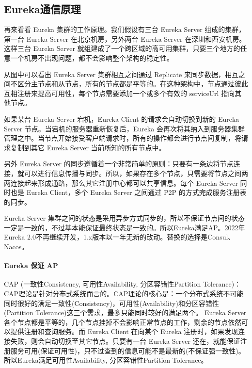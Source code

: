 \documentclass[../../../interview-questions.tex]{subfiles}
\begin{document}
\subsection{Eureka通信原理}

再来看看 Eureka 集群的工作原理。我们假设有三台 Eureka Server 组成的集群，第一台 Eureka Server 在北京机房，另外两台 Eureka Server 在深圳和西安机房。这样三台 Eureka Server 就组建成了一个跨区域的高可用集群，只要三个地方的任意一个机房不出现问题，都不会影响整个架构的稳定性。

从图中可以看出 Eureka Server 集群相互之间通过 Replicate 来同步数据，相互之间不区分主节点和从节点，所有的节点都是平等的。在这种架构中，节点通过彼此互相注册来提高可用性，每个节点需要添加一个或多个有效的 serviceUrl 指向其他节点。

如果某台 Eureka Server 宕机，Eureka Client 的请求会自动切换到新的 Eureka Server 节点。当宕机的服务器重新恢复后，Eureka 会再次将其纳入到服务器集群管理之中。当节点开始接受客户端请求时，所有的操作都会进行节点间复制，将请求复制到其它 Eureka Server 当前所知的所有节点中。

另外 Eureka Server 的同步遵循着一个非常简单的原则：只要有一条边将节点连接，就可以进行信息传播与同步。所以，如果存在多个节点，只需要将节点之间两两连接起来形成通路，那么其它注册中心都可以共享信息。每个 Eureka Server 同时也是 Eureka Client，多个 Eureka Server 之间通过 P2P 的方式完成服务注册表的同步。

Eureka Server 集群之间的状态是采用异步方式同步的，所以不保证节点间的状态一定是一致的，不过基本能保证最终状态是一致的。所以Eureka满足AP。2022年Eureka 2.0不再继续开发，1.x版本以一年无新的改动。替换的选择是Consul、Nacos。

\paragraph{Eureka 保证 AP}

CAP (一致性Consistency, 可用性Availability, 分区容错性Partition Tolerance)：CAP理论是针对分布式系统而言的。CAP理论的核心是：一个分布式系统不可能同时很好的满足一致性(Consistency)，可用性(Availability)和分区容错性(Partition Tolerance)这三个需求，最多只能同时较好的满足两个。
Eureka Server 各个节点都是平等的，几个节点挂掉不会影响正常节点的工作，剩余的节点依然可以提供注册和查询服务。而 Eureka Client 在向某个 Eureka 注册时，如果发现连接失败，则会自动切换至其它节点。只要有一台 Eureka Server 还在，就能保证注册服务可用(保证可用性)，只不过查到的信息可能不是最新的(不保证强一致性)。所以Eureka满足可用性Availability, 分区容错性Partition Tolerance。
\end{document}
